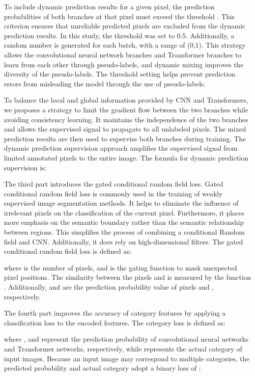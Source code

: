 \documentclass[sigconf,natbib=false]{acmart}
\begin{document}
To include dynamic prediction results for a given pixel, the prediction probabilities of both branches at that pixel must exceed the threshold . This criterion ensures that unreliable predicted pixels are excluded from the dynamic prediction results. In this study, the threshold was set to 0.5. Additionally, a random number  is generated for each batch, with a range of (0,1). This strategy allows the convolutional neural network branches and Transformer branches to learn from each other through pseudo-labels, and dynamic mixing improves the diversity of the pseudo-labels. The threshold setting helps prevent prediction errors from misleading the model through the use of pseudo-labels.

To balance the local and global information provided by CNN and Transformers, we proposes a strategy to limit the gradient flow between the two branches while avoiding consistency learning. It maintains the independence of the two branches and allows the supervised signal to propagate to all unlabeled pixels. The mixed prediction results are then used to supervise both branches during training. The dynamic prediction  supervision approach amplifies the supervised signal from limited annotated pixels to the entire image. The formula for dynamic prediction supervision is:

The third part introduces the gated conditional random field loss. Gated conditional random field loss is commonly used in the training of weakly supervised image segmentation methods. It helps to eliminate the influence of irrelevant pixels on the classification of the current pixel. Furthermore, it places more emphasis on the semantic boundary rather than the semantic relationship between regions. This simplifies the process of combining a conditional Random field and CNN. Additionally, it does rely on high-dimensional filters. The gated conditional random field loss is defined as:

where  is the number of pixels, and  is the gating function to mask unexpected pixel positions.  The similarity between the pixels  and  is measured by the function . Additionally,  and  are the prediction probability value of pixels  and , respectively.

The fourth part improves the accuracy of category features by applying a classification loss to the encoded features. The category loss is defined as:

where , and  represent the prediction probability of convolutional neural networks and Transformer networks, respectively, while  represents the actual category of input images. Because an input image may correspond to multiple categories, the predicted probability and actual category adopt a binary loss of :
\end{document}
